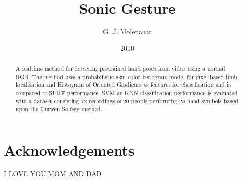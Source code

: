 \documentclass[a4paper]{report}
\begin{document}
\title{Sonic Gesture}
\author{G. J. Molenaaar}
\date{2010}

\maketitle{}

\newpage{}

\begin{abstract}
A real\-time method for detecting pre\-trained hand poses from
video using a normal RGB. The method uses a probabilistic skin color histogram model for pixel based limb localisation and Histogram of Oriented Gradients as features for classification and is compared to SURF performance. SVM an KNN classification performance is evaluated with a dataset consisting 72 recordings of 20 people performing 28 hand symbols based upon the Curwen Solfege method. 
\end{abstract}
\newpage{}

\tableofcontents{}
\listoffigures{}
\listoftables{}

\chapter*{Acknowledgements}
I LOVE YOU MOM AND DAD
















\end{document}
